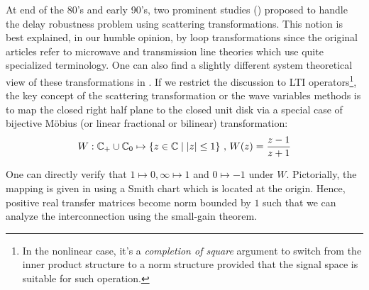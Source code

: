At end of the 80's and early 90's, two prominent studies (\cite{andersonspong,nieslotine}) proposed to handle the delay 
robustness problem using scattering transformations. This notion is best explained, in our humble opinion, by loop transformations 
since the original articles refer to microwave and transmission line theories which use quite specialized terminology. One can also
find a slightly different system theoretical view of these transformations in \cite{colgate3}. If we restrict the discussion to LTI
operators\footnote{In the nonlinear case, it's a \emph{completion of square} argument to switch from the inner product structure to a 
norm structure provided that the signal space is suitable for such operation.}, the key concept of the scattering transformation
or the wave variables methods is to map the closed right half plane to the closed unit disk via a special case of bijective M\"{o}bius 
(or linear fractional or bilinear) transformation: 
\begin{equation}
W: \mathbb{C}_+\cup \mathbb{C}_0 \mapsto \left\{ z\in\mathbb{C} \mid \displaystyle \left|z\right| \leq 1 \right\}\, ,\, W(z) = \frac{z-1}{z+1}
\label{eq:lit:smith}
\end{equation}

One can directly verify that $1\mapsto 0,\infty\mapsto 1$ and $0\mapsto -1$ under $W$. Pictorially, the mapping is given in 
 using a Smith chart which is located at the origin. Hence, positive real transfer matrices
become norm bounded by $1$ such that we can analyze the interconnection using the small-gain theorem.


